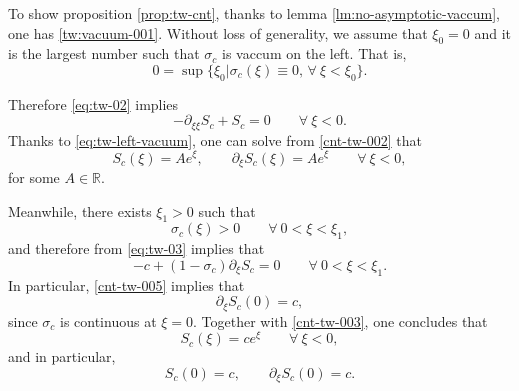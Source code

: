 \documentclass[12pt]{article}
\theoremstyle{definition}
\theoremstyle{remark}
\numberwithin{equation}{section}
\begin{document}
To show proposition \ref{prop:tw-cnt},
thanks to lemma \ref{lm:no-asymptotic-vaccum}, one has \eqref{tw:vacuum-001}. Without loss of generality, we assume that $  \xi_0 = 0 $ and it is the largest number such that $ \sigma_c $ is vaccum on the left. That is,
\begin{equation}
\label{cnt-tw-001}
0 = \sup\lbrace \xi_0 \vert \sigma_c(\xi) \equiv 0, \, \forall \ \xi < \xi_0 \rbrace. 
\end{equation}

Therefore \eqref{eq:tw-02} implies
\begin{equation}\label{cnt-tw-002}
-\partial_{\xi\xi}S_c+S_c=0 \qquad \forall \ \xi < 0.
\end{equation}
Thanks to \eqref{eq:tw-left-vacuum}, one can solve from \eqref{cnt-tw-002} that 
\begin{equation}\label{cnt-tw-003}
S_c(\xi)=Ae^\xi,
\qquad
\partial_\xi S_c(\xi)=Ae^\xi \qquad \forall \ \xi < 0,
\end{equation}
for some $ A \in \mathbb R $. 

Meanwhile, there exists $ \xi_1 > 0 $ such that 
\begin{equation}
    \label{cnt-tw-004}
    \sigma_c(\xi) > 0 \qquad \forall \ 0 < \xi < \xi_1,
\end{equation}
and therefore from \eqref{eq:tw-03} implies that
\begin{equation}
    \label{cnt-tw-005}
    -c + (1-\sigma_c) \partial_\xi S_c = 0 \qquad \forall \ 0 < \xi < \xi_1.
\end{equation}
In particular, \eqref{cnt-tw-005} implies that
\begin{equation}
    \label{cnt-tw-006}
    \partial_\xi S_c(0) = c,
\end{equation}
since $ \sigma_c $ is continuous at $ \xi = 0 $. Together with \eqref{cnt-tw-003}, one concludes that 
\begin{equation}
    \label{cnt-tw-007}
    S_c(\xi) = c e^\xi \qquad \forall \ \xi < 0,
\end{equation}
and in particular,
\begin{equation}
\label{cnt-tw-008}
S_c(0)=c,
\qquad
\partial_\xi S_c(0)=c.
\end{equation}
\end{document}
